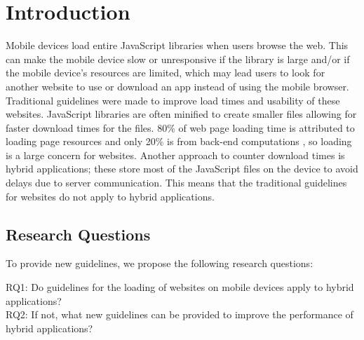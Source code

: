 \documentclass{acm_proc_article-sp}
\begin{document}



\section{Introduction}
Mobile devices load entire JavaScript libraries when users browse the web.
This can make the mobile device slow or unresponsive if the library is large and/or if the mobile device’s resources are limited, which may lead users to look for another website to use or download an app instead of using the mobile browser.
Traditional guidelines were made to improve load times and usability of these websites.
JavaScript libraries are often minified to create smaller files allowing for faster download times for the files.
80\% of web page loading time is attributed to loading page resources and only 20\% is from back-end computations \cite{souders2008high}, so loading is a large concern for websites.
Another approach to counter download times is hybrid applications; these store most of the JavaScript files on the device to avoid delays due to server communication.
This means that the traditional guidelines for websites do not apply to hybrid applications.
\subsection{Research Questions}
To provide new guidelines, we propose the following research questions:

RQ1: Do guidelines for the loading of websites on mobile devices apply to hybrid applications?\\
RQ2: If not, what new guidelines can be provided to improve the performance of hybrid applications?
\end{document}
